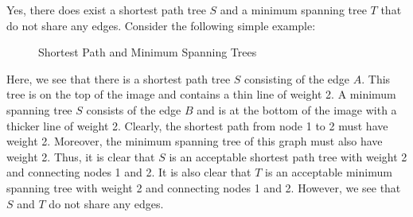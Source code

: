 \documentclass[psamsfonts]{amsart}
\newenvironment{sol}{{\bfseries Solution}}{\qedsymbol}
\theoremstyle{definition}
\theoremstyle{remark}
\numberwithin{equation}{section}
\begin{document}
\begin{sol}
Yes, there does exist a shortest path tree $S$ and a minimum spanning tree $T$ that do not share any edges. Consider the following simple example:
\begin{figure}[h!]
\caption{Shortest Path and Minimum Spanning Trees}
\end{figure}

Here, we see that there is a shortest path tree $S$ consisting of the edge $A$. This tree is on the top of the image and contains a thin line of weight 2. A minimum spanning tree $S$ consists of the edge $B$ and is at the bottom of the image with a thicker line of weight 2. Clearly, the shortest path from node 1 to 2 must have weight 2. Moreover, the minimum spanning tree of this graph must also have weight 2. Thus, it is clear that $S$ is an acceptable shortest path tree with weight 2 and connecting nodes 1 and 2. It is also clear that $T$ is an acceptable minimum spanning tree with weight 2 and connecting nodes 1 and 2. However, we see that $S$ and $T$ do not share any edges. 
\end{sol}
\end{document}
